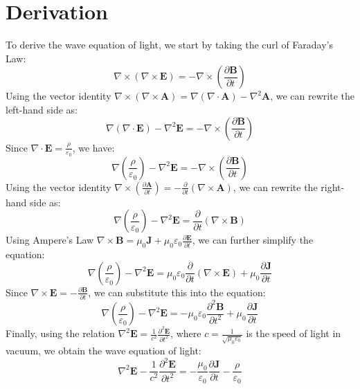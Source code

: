 \documentclass[9pt,a4paper, twocolumn]{article}
\begin{document}
        \section{Derivation}
        To derive the wave equation of light, we start by taking the curl of Faraday's Law:
        \begin{equation*}
        \nabla \times (\nabla \times \mathbf{E}) = -\nabla \times \left(\frac{\partial \mathbf{B}}{\partial t}\right)
        \end{equation*}
        Using the vector identity $\nabla \times (\nabla \times \mathbf{A}) = \nabla(\nabla \cdot \mathbf{A}) - \nabla^2\mathbf{A}$, we can rewrite the left-hand side as:
        \begin{equation*}
        \nabla(\nabla \cdot \mathbf{E}) - \nabla^2\mathbf{E} = -\nabla \times \left(\frac{\partial \mathbf{B}}{\partial t}\right)
        \end{equation*}
        Since $\nabla \cdot \mathbf{E} = \frac{\rho}{\varepsilon_0}$, we have:
        \begin{equation*}
        \nabla\left(\frac{\rho}{\varepsilon_0}\right) - \nabla^2\mathbf{E} = -\nabla \times \left(\frac{\partial \mathbf{B}}{\partial t}\right)
        \end{equation*}
        Using the vector identity $\nabla \times \left(\frac{\partial \mathbf{A}}{\partial t}\right) = -\frac{\partial}{\partial t}(\nabla \times \mathbf{A})$, we can rewrite the right-hand side as:
        \begin{equation*}
        \nabla\left(\frac{\rho}{\varepsilon_0}\right) - \nabla^2\mathbf{E} = \frac{\partial}{\partial t}(\nabla \times \mathbf{B})
        \end{equation*}
        Using Ampere's Law $\nabla \times \mathbf{B} = \mu_0 \mathbf{J} + \mu_0\varepsilon_0 \frac{\partial \mathbf{E}}{\partial t}$, we can further simplify the equation:
        \begin{equation*}
        \nabla\left(\frac{\rho}{\varepsilon_0}\right) - \nabla^2\mathbf{E} = \mu_0\varepsilon_0 \frac{\partial}{\partial t}(\nabla \times \mathbf{E}) + \mu_0 \frac{\partial \mathbf{J}}{\partial t}
        \end{equation*}
        Since $\nabla \times \mathbf{E} = -\frac{\partial \mathbf{B}}{\partial t}$, we can substitute this into the equation:
        \begin{equation*}
        \nabla\left(\frac{\rho}{\varepsilon_0}\right) - \nabla^2\mathbf{E} = -\mu_0\varepsilon_0 \frac{\partial^2 \mathbf{B}}{\partial t^2} + \mu_0 \frac{\partial \mathbf{J}}{\partial t}
        \end{equation*}
        Finally, using the relation $\nabla^2\mathbf{E} = \frac{1}{c^2} \frac{\partial^2 \mathbf{E}}{\partial t^2}$, where $c = \frac{1}{\sqrt{\mu_0\varepsilon_0}}$ is the speed of light in vacuum, we obtain the wave equation of light:
        \begin{equation*}
        \nabla^2\mathbf{E} - \frac{1}{c^2} \frac{\partial^2 \mathbf{E}}{\partial t^2} = -\frac{\mu_0}{\varepsilon_0} \frac{\partial \mathbf{J}}{\partial t} - \frac{\rho}{\varepsilon_0}
        \end{equation*}
\end{document}
